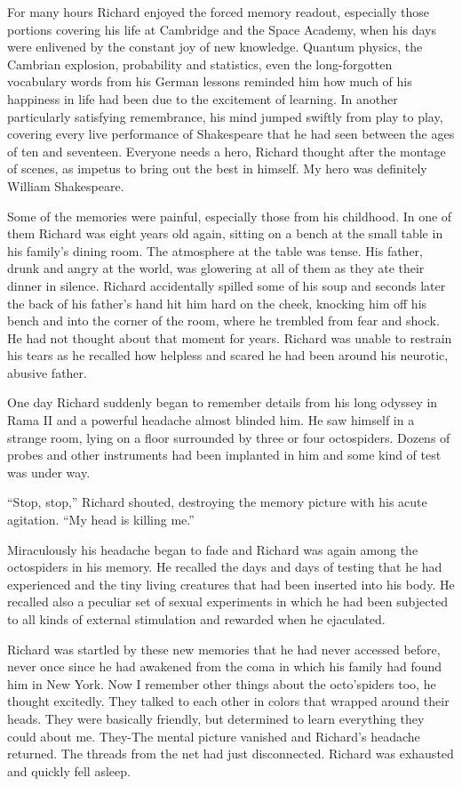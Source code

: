 \documentclass[]{article}
\begin{document}
{{For many hours Richard enjoyed the forced memory readout, especially those portions covering his life at Cambridge and the Space Academy, when his days were enlivened by the constant joy of new knowledge. Quantum physics, the Cambrian explosion, probability and statistics, even the long-forgotten vocabulary words from his German lessons reminded him how much of his happiness in life had been due to the excitement of learning. In another particularly satisfying remembrance, his mind jumped swiftly from play to play, covering every live performance of Shakespeare that he had seen between the ages of ten and seventeen. Everyone needs a hero, Richard thought after the montage of scenes, as impetus to bring out the best in himself. My hero was definitely William Shakespeare.

Some of the memories were painful, especially those from his childhood. In one of them Richard was eight years old again, sitting on a bench at the small table in his family’s dining room. The atmosphere at the table was tense. His father, drunk and angry at the world, was glowering at all of them as they ate their dinner in silence. Richard accidentally spilled some of his soup and seconds later the back of his father’s hand hit him hard on the cheek, knocking him off his bench and into the corner of the room, where he trembled from fear and shock. He had not thought about that moment for years. Richard was unable to restrain his tears as he recalled how helpless and scared he had been around his neurotic, abusive father.

One day Richard suddenly began to remember details from his long odyssey in Rama II and a powerful headache almost blinded him. He saw himself in a strange room, lying on a floor surrounded by three or four octospiders. Dozens of probes and other instruments had been implanted in him and some kind of test was under way.

“Stop, stop,” Richard shouted, destroying the memory picture with his acute agitation. “My head is killing me.”

Miraculously his headache began to fade and Richard was again among the octospiders in his memory. He recalled the days and days of testing that he had experienced and the tiny living creatures that had been inserted into his body. He recalled also a peculiar set of sexual experiments in which he had been subjected to all kinds of external stimulation and rewarded when he ejaculated.

Richard was startled by these new memories that he had never accessed before, never once since he had awakened from the coma in which his family had found him in New York. Now I remember other things about the octo’spiders too, he thought excitedly. They talked to each other in colors that wrapped around their heads. They were basically friendly, but determined to learn everything they could about me. They-The mental picture vanished and Richard’s headache returned. The threads from the net had just disconnected. Richard was exhausted and quickly fell asleep.

}}
\end{document}
